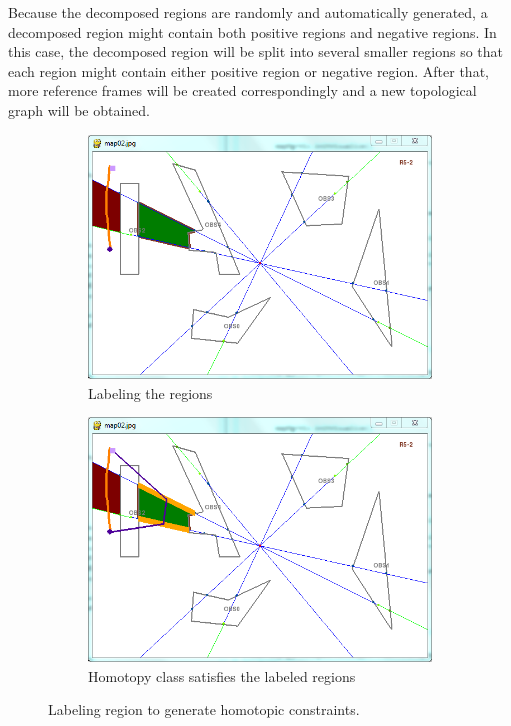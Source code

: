 \documentclass[letterpaper, 10 pt, conference]{ieeeconf}
\begin{document}
Because the decomposed regions are randomly and automatically generated, a decomposed region might contain both positive regions and negative regions.
In this case, the decomposed region will be split into several smaller regions so that each region might contain either positive region or negative region.
After that, more reference frames will be created correspondingly and a new topological graph will be obtained.

\begin{figure}
	\centering
	\begin{subfigure}[t]{0.47\linewidth}
		\centering
		\includegraphics[width=\textwidth]{fig/regionlabel1.png}
		\caption{Labeling the regions}
		\label{fig:region_label:label}
	\end{subfigure}  
	\begin{subfigure}[t]{0.47\linewidth}
		\centering
		\includegraphics[width=\textwidth]{fig/regionlabelhomo1.png}
		\caption{Homotopy class satisfies the labeled regions}
		\label{fig:region_label:constraint}
	\end{subfigure}   
	\caption{Labeling region to generate homotopic constraints.}
	\label{fig:region_label}
\end{figure}
\end{document}
